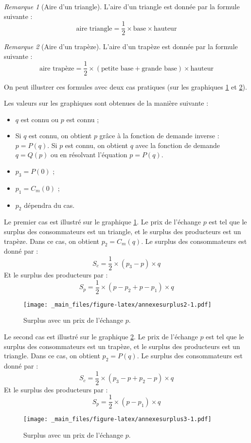 \documentclass[
  a4paper,
]{book}
\providecommand{\tightlist}{%
  \setlength{\itemsep}{0pt}\setlength{\parskip}{0pt}}
\theoremstyle{definition}
\theoremstyle{definition}
\theoremstyle{definition}
\theoremstyle{definition}
\theoremstyle{remark}
\newtheorem*{remark}{Remarque}
\begin{document}
\begin{remark}[Aire d'un triangle]
L'aire d'un triangle est donnée par la formule suivante :
\[\text{aire triangle}=\frac{1}{2}\times\text{base}\times\text{hauteur}\]
\end{remark}

\begin{remark}[Aire d'un trapèze]
L'aire d'un trapèze est donnée par la formule suivante :
\[\text{aire trapèze}=\frac{1}{2}\times(\text{petite base}+\text{grande base})\times\text{hauteur}\]
\end{remark}

On peut illustrer ces formules avec deux cas pratiques (sur les graphiques \ref{fig:annexesurplus2} et \ref{fig:annexesurplus3}).

Les valeurs sur les graphiques sont obtenues de la manière suivante :

\begin{itemize}
\tightlist
\item
  \(q\) est connu ou \(p\) est connu ;
\item
  Si \(q\) est connu, on obtient \(p\) grâce à la fonction de demande inverse : \(p=P(q)\).
  Si \(p\) est connu, on obtient \(q\) avec la fonction de demande \(q=Q(p)\) ou en résolvant l'équation \(p=P(q)\).
\item
  \(p_3=P(0)\) ;
\item
  \(p_1=C_m(0)\) ;
\item
  \(p_2\) dépendra du cas.
\end{itemize}

Le premier cas est illustré sur le graphique \ref{fig:annexesurplus2}.
Le prix de l'échange \(p\) est tel que le surplus des consommateurs est un triangle, et le surplus des producteurs est un trapèze.
Dans ce cas, on obtient \(p_2= C_m(q)\).
Le surplus des consommateurs est donné par :
\[
S_c=\frac{1}{2}\times(p_3-p)\times q
\]
Et le surplus des producteurs par :
\[
S_p=\frac{1}{2}\times(p-p_2+p-p_1)\times q
\]

\begin{figure}
\centering
\texttt{[image: \_main\_files/figure-latex/annexesurplus2-1.pdf]}
\caption{\label{fig:annexesurplus2}Surplus avec un prix de l'échange \(p\).}
\end{figure}

Le second cas est illustré sur le graphique \ref{fig:annexesurplus3}.
Le prix de l'échange \(p\) est tel que le surplus des consommateurs est un trapèze, et le surplus des producteurs est un triangle.
Dans ce cas, on obtient \(p_2= P(q)\).
Le surplus des consommateurs est donné par :
\[
S_c=\frac{1}{2}\times(p_3-p+p_2-p)\times q
\]
Et le surplus des producteurs par :
\[
S_p=\frac{1}{2}\times(p-p_1)\times q
\]

\begin{figure}
\centering
\texttt{[image: \_main\_files/figure-latex/annexesurplus3-1.pdf]}
\caption{\label{fig:annexesurplus3}Surplus avec un prix de l'échange \(p\).}
\end{figure}

  
\end{document}
